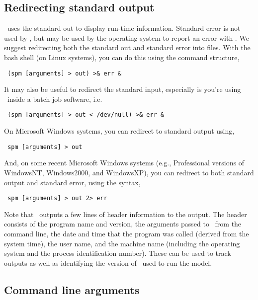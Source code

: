 \subsection{Redirecting standard output\label{sec:redirecting-stdout}}

\SPM\ uses the standard out to display run-time information. Standard error is not used by \SPM, but may be used by the operating system to report an error with \SPM. We suggest redirecting both the standard out and standard error into files. With the bash shell (on Linux systems), you can do this using the command structure,

\begin{verbatim} (spm [arguments] > out) >& err &\end{verbatim}

It may also be useful to redirect the standard input, especially is you're using \SPM\ inside a batch job software, i.e. 

\begin{verbatim} (spm [arguments] > out < /dev/null) >& err &\end{verbatim}

On Microsoft Windows systems, you can redirect to standard output using,

\begin{verbatim} spm [arguments] > out\end{verbatim}

And, on some recent Microsoft Windows systems (e.g., Professional versions of WindowsNT, Windows2000, and WindowsXP), you can redirect to both standard output and standard error, using the syntax, 

\begin{verbatim} spm [arguments] > out 2> err\end{verbatim}

Note that \SPM\ outputs a few lines of header information to the output. The header consists of the program name and version, the arguments passed to \SPM\ from the command line, the date and time that the program was called (derived from the system time), the user name, and the machine name (including the operating system and the process identification number). These can be used to track outputs as well as identifying the version of \SPM\ used to run the model.

\subsection{Command line arguments\label{sec:command-line-arguments}}

